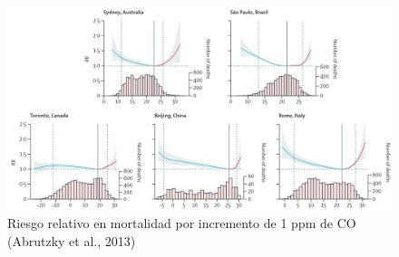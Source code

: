 \documentclass[]{book}
\begin{document}
\begin{figure}
\includegraphics[width=18.97in,height=1.8\textheight]{figs/temp1} \caption{Riesgo relativo en mortalidad por incremento de 1 ppm de CO (Abrutzky et al., 2013)}\label{fig:unnamed-chunk-40}
\end{figure}


\end{document}
